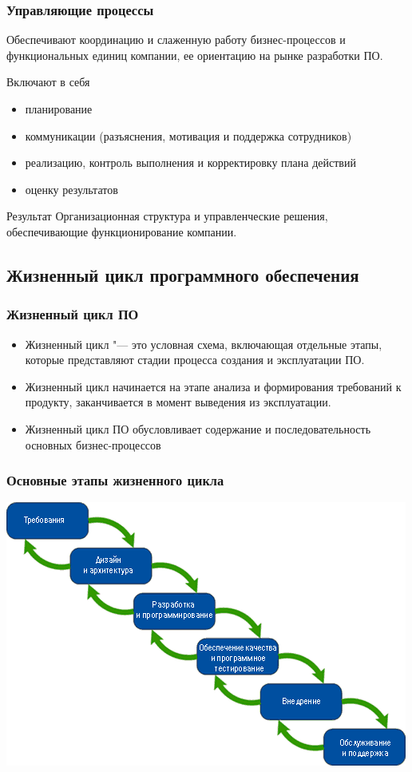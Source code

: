 \documentclass{../industrial-development}
\begin{document}
\begin{frame} \frametitle{Управляющие процессы}
	Обеспечивают координацию и слаженную работу бизнес-процессов и функциональных единиц компании, ее ориентацию на рынке разработки ПО.
	
	\begin{block}{Включают в себя}
		\begin{itemize}
		\item планирование
		\item коммуникации (разъяснения, мотивация и поддержка сотрудников)
		\item реализацию, контроль выполнения и корректировку плана действий
		\item оценку результатов
		\end{itemize}
	\end{block}
	\begin{block}{Результат}
		Организационная структура и управленческие решения, обеспечивающие функционирование компании.
	\end{block}
\end{frame}
\lecturenotes


\subsection{Жизненный цикл программного обеспечения}


\begin{frame} \frametitle{Жизненный цикл ПО}
	\begin{itemize}
		\item \alert{Жизненный цикл} "--- это условная схема, включающая отдельные этапы, которые представляют стадии процесса создания и эксплуатации ПО.
		\item \alert{Жизненный цикл} начинается на этапе анализа и формирования требований к продукту, заканчивается в момент выведения из эксплуатации.
		\item \alert{Жизненный цикл} ПО обусловливает содержание и последовательность основных бизнес-процессов
	\end{itemize}
\end{frame}
\lecturenotes


\begin{frame} \frametitle{Основные этапы жизненного цикла}
	\centerline{\includegraphics[height=0.70\textheight]{image15.png}}	
\end{frame}
\lecturenotes
\end{document}

